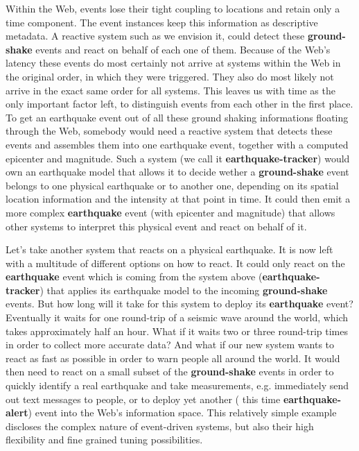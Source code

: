 Within the Web, events lose their tight coupling to locations and retain only a time component.
The event instances keep this information as descriptive metadata.
A reactive system such as we envision it, could detect these \textrm{\textbf{ground-shake}} events and react on behalf of each one of them.
Because of the Web's latency these events do most certainly not arrive at systems within the Web in the original order, in which they were triggered.
They also do most likely not arrive in the exact same order for all systems.
This leaves us with time as the only important factor left, to distinguish events from each other in the first place.
To get an earthquake event out of all these ground shaking informations floating through the Web, somebody would need a reactive system that detects these events and assembles them into one earthquake event, together with a computed epicenter and magnitude.
Such a system (we call it \textrm{\textbf{earthquake-tracker}}) would own an earthquake model that allows it to decide wether a \textrm{\textbf{ground-shake}} event belongs to one physical earthquake or to another one, depending on its spatial location information and the intensity at that point in time.
It could then emit a more complex \textrm{\textbf{earthquake}} event (with epicenter and magnitude) that allows other systems to interpret this physical event and react on behalf of it.

Let's take another system that reacts on a physical earthquake.
It is now left with a multitude of different options on how to react.
It could only react on the \textrm{\textbf{earthquake}} event which is coming from the system above (\textrm{\textbf{earthquake-tracker}}) that applies its earthquake model to the incoming \textrm{\textbf{ground-shake}} events.
But how long will it take for this system to deploy its \textrm{\textbf{earthquake}} event?
Eventually it waits for one round-trip of a seismic wave around the world, which takes approximately half an hour.
What if it waits two or three round-trip times in order to collect more accurate data?
And what if our new system wants to react as fast as possible in order to warn people all around the world.
It would then need to react on a small subset of the \textrm{\textbf{ground-shake}} events in order to quickly identify a real earthquake and take measurements, e.g. immediately send out text messages to people, or to deploy yet another ( this time \textrm{\textbf{earthquake-alert}}) event into the Web's information space.
This relatively simple example discloses the complex nature of event-driven systems, but also their high flexibility and fine grained tuning possibilities.

